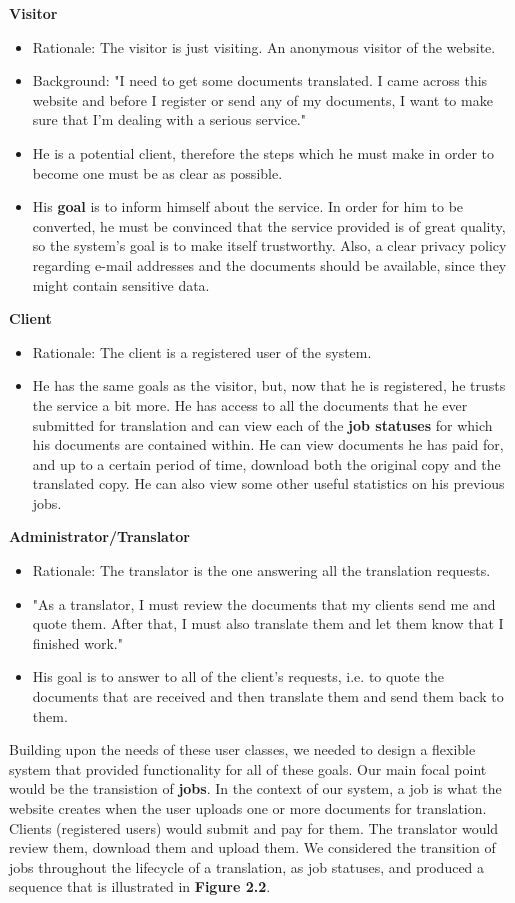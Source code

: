 \documentclass{l3proj}
\begin{document}
\textbf{Visitor}
\begin{itemize}
\item{Rationale: The visitor is just visiting. An anonymous visitor of the website.}
\item{Background: "I need to get some documents translated. I came across this website and before I register or send any of my documents, I want to make sure that I’m dealing with a serious service."}
\item{He is a potential client, therefore the steps which he must make in order to become one must be as clear as possible.}
\item{His \textbf{goal} is to inform himself about the service. In order for him to be converted, he must be convinced that the service provided is of great quality, so the system’s goal is to make itself trustworthy. Also, a clear privacy policy regarding e-mail addresses and the documents should be available, since they might contain sensitive data.}
\end{itemize}
\textbf{Client}
\begin{itemize}
\item{Rationale: The client is a registered user of the system.}
\item{He has the same goals as the visitor, but, now that he is registered, he trusts the service a bit more. He has access to all the documents that he ever submitted for translation and can view each of the \textbf{job statuses} for which his documents are contained within. He can view documents he has paid for, and up to a certain period of time, download both the original copy and the translated copy. He can also view some other useful statistics on his previous jobs.}
\end{itemize}
\textbf{Administrator/Translator}
\begin{itemize}
\item{Rationale: The translator is the one answering all the translation requests.}
\item{"As a translator, I must review the documents that my clients send me and quote them. After that, I must also translate them and let them know that I finished work."}
\item{His goal is to answer to all of the client’s requests, i.e. to quote the documents that are received and then translate them and send them back to them.}
\end{itemize}
Building upon the needs of these user classes, we needed to design a flexible system that provided functionality for all of these goals. Our main focal point would be the transistion of \textbf{jobs}. In the context of our system, a job is what the website creates when the user uploads one or more documents for translation. Clients (registered users) would submit and pay for them. The translator would review them, download them and upload them. We considered the transition of jobs throughout the lifecycle of a translation, as job statuses, and produced a sequence that is illustrated in \textbf{Figure 2.2}. 
\end{document}
